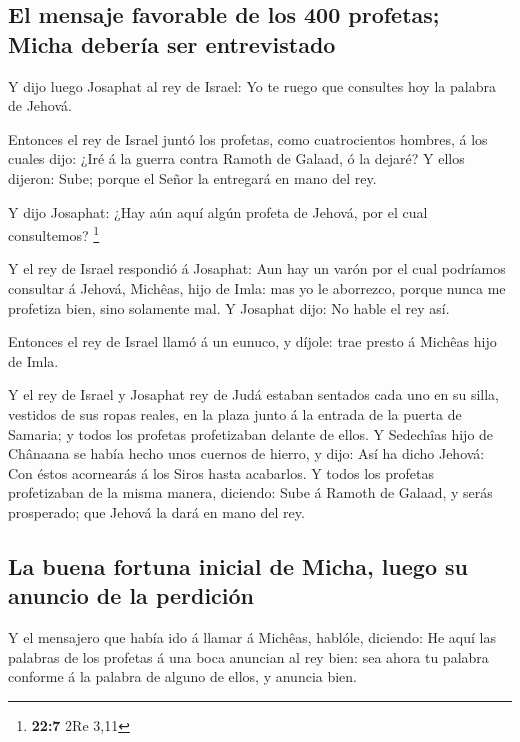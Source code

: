 \hypertarget{el-mensaje-favorable-de-los-400-profetas-micha-deberuxeda-ser-entrevistado}{%
\subsection{El mensaje favorable de los 400 profetas; Micha debería ser
entrevistado}\label{el-mensaje-favorable-de-los-400-profetas-micha-deberuxeda-ser-entrevistado}}

 Y dijo luego Josaphat al rey de Israel: Yo te ruego que
consultes hoy la palabra de Jehová.

 Entonces el rey de Israel juntó los profetas, como
cuatrocientos hombres, á los cuales dijo: ¿Iré á la guerra contra Ramoth
de Galaad, ó la dejaré? Y ellos dijeron: Sube; porque el Señor la
entregará en mano del rey.

 Y dijo Josaphat: ¿Hay aún aquí algún profeta de Jehová,
por el cual consultemos? \footnote{\textbf{22:7} 2Re 3,11}

 Y el rey de Israel respondió á Josaphat: Aun hay un varón
por el cual podríamos consultar á Jehová, Michêas, hijo de Imla: mas yo
le aborrezco, porque nunca me profetiza bien, sino solamente mal. Y
Josaphat dijo: No hable el rey así.

 Entonces el rey de Israel llamó á un eunuco, y díjole:
trae presto á Michêas hijo de Imla.

 Y el rey de Israel y Josaphat rey de Judá estaban
sentados cada uno en su silla, vestidos de sus ropas reales, en la plaza
junto á la entrada de la puerta de Samaria; y todos los profetas
profetizaban delante de ellos.  Y Sedechîas hijo de
Chânaana se había hecho unos cuernos de hierro, y dijo: Así ha dicho
Jehová: Con éstos acornearás á los Siros hasta acabarlos.
 Y todos los profetas profetizaban de la misma manera,
diciendo: Sube á Ramoth de Galaad, y serás prosperado; que Jehová la
dará en mano del rey.

\hypertarget{la-buena-fortuna-inicial-de-micha-luego-su-anuncio-de-la-perdiciuxf3n}{%
\subsection{La buena fortuna inicial de Micha, luego su anuncio de la
perdición}\label{la-buena-fortuna-inicial-de-micha-luego-su-anuncio-de-la-perdiciuxf3n}}

 Y el mensajero que había ido á llamar á Michêas,
hablóle, diciendo: He aquí las palabras de los profetas á una boca
anuncian al rey bien: sea ahora tu palabra conforme á la palabra de
alguno de ellos, y anuncia bien.


